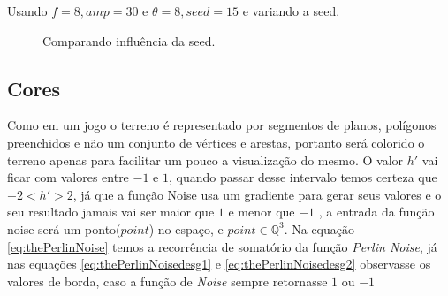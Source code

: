 Usando $f = 8, amp = 30$ e $\theta = 8, seed = 15$ e variando a seed.

\begin{figure}[H]
     \centering
     \hspace{0.1cm}
     \hspace{0.1cm}
     \caption{Comparando influência da seed.}
     \label{fig:parametrosSeed}
\end{figure}


\subsection{Cores}
Como em um jogo o terreno é representado por segmentos de planos, polígonos preenchidos e não um conjunto
de vértices e arestas, portanto será colorido o terreno apenas para facilitar um pouco a
visualização do mesmo. O valor $h'$ vai ficar com valores entre $-1$ e $1$, 
quando passar desse intervalo temos certeza que $-2 < h' > 2$, já que a função Noise 
usa um gradiente para gerar seus valores e o seu resultado jamais vai ser maior que $1$
e menor que $-1$ \cite{perlin1985image}, a entrada da função noise será um ponto($point$) no espaço, e $point \in \mathbb{Q}^{3}$.
Na equação \ref{eq:thePerlinNoise} temos a recorrência de somatório da função
\textit{Perlin Noise}, já nas equações \ref{eq:thePerlinNoisedesg1} e \ref{eq:thePerlinNoisedesg2}
observasse os valores de borda, caso a função de \textit{Noise} sempre retornasse $1$ ou $-1$

